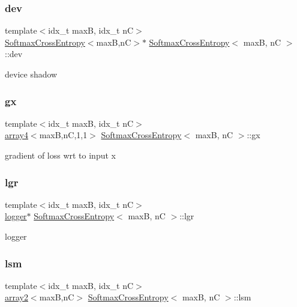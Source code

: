 \subsubsection{\texorpdfstring{dev}{dev}}
{\footnotesize\ttfamily template$<$idx\+\_\+t maxB, idx\+\_\+t nC$>$ \\
\hyperlink{structSoftmaxCrossEntropy}{Softmax\+Cross\+Entropy}$<$maxB,nC$>$$\ast$ \hyperlink{structSoftmaxCrossEntropy}{Softmax\+Cross\+Entropy}$<$ maxB, nC $>$\+::dev}

device shadow \mbox{\label{structSoftmaxCrossEntropy_abc18b5561486ac3855176b6a74e1726b}} 
\subsubsection{\texorpdfstring{gx}{gx}}
{\footnotesize\ttfamily template$<$idx\+\_\+t maxB, idx\+\_\+t nC$>$ \\
\hyperlink{structarray4}{array4}$<$maxB,nC,1,1$>$ \hyperlink{structSoftmaxCrossEntropy}{Softmax\+Cross\+Entropy}$<$ maxB, nC $>$\+::gx}

gradient of loss wrt to input x \mbox{\label{structSoftmaxCrossEntropy_a10a76ce6a1cd3e1d1a57c0f2ba42f5a0}} 
\subsubsection{\texorpdfstring{lgr}{lgr}}
{\footnotesize\ttfamily template$<$idx\+\_\+t maxB, idx\+\_\+t nC$>$ \\
\hyperlink{structlogger}{logger}$\ast$ \hyperlink{structSoftmaxCrossEntropy}{Softmax\+Cross\+Entropy}$<$ maxB, nC $>$\+::lgr}

logger \mbox{\label{structSoftmaxCrossEntropy_a52f15cc4720bbc8f7550577726492e99}} 
\subsubsection{\texorpdfstring{lsm}{lsm}}
{\footnotesize\ttfamily template$<$idx\+\_\+t maxB, idx\+\_\+t nC$>$ \\
\hyperlink{structarray2}{array2}$<$maxB,nC$>$ \hyperlink{structSoftmaxCrossEntropy}{Softmax\+Cross\+Entropy}$<$ maxB, nC $>$\+::lsm}

